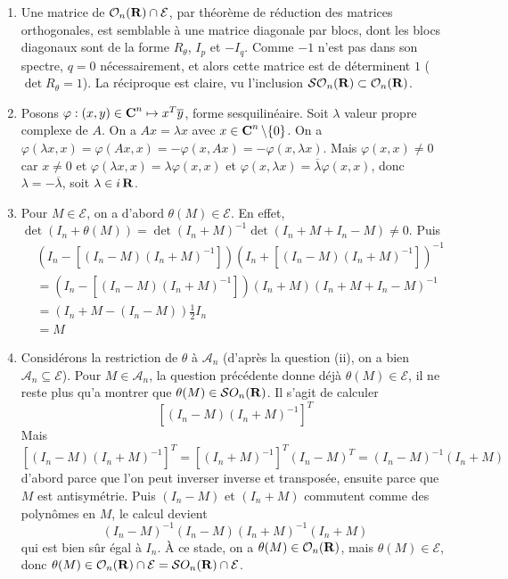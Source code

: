 \begin{correction}
	\begin{enumerate}
		\item Une matrice de $\mathcal O_n(\operatorname{\mathbf{R}})\cap \mathcal E$, par théorème de réduction des matrices orthogonales,
		est semblable à une matrice diagonale par blocs, dont les blocs diagonaux sont de la forme $R_\theta$, $I_p$ et $-I_q$.
		Comme $-1$ n'est pas dans son spectre, $q=0$ nécessairement, et alors cette matrice est de déterminent $1$ ($\det R_\theta = 1$).
		La réciproque est claire, vu l'inclusion $\mathcal{SO}_n(\operatorname{\mathbf{R}})\subset \mathcal{O}_n(\operatorname{\mathbf{R}})$.

		\item Posons $\varphi:(x,y)\in\operatorname{\mathbf{C}}^n\mapsto x^T\overline y$, forme sesquilinéaire. 
		Soit $\lambda$ valeur propre complexe de $A$. 
		On a $Ax=\lambda x$ avec $x\in \operatorname{\mathbf{C}}^n\backslash\lbrace 0\rbrace$. 
		On a $\varphi(\lambda x,x)=\varphi(Ax,x)=-\varphi(x,Ax)=-\varphi(x,\lambda x)$.
		Mais $\varphi(x,x)\neq 0$ car $x\neq 0$ et $\varphi(\lambda x,x)=\lambda\varphi(x,x)$ et $\varphi(x,\lambda x)=\overline\lambda\varphi(x,x)$,
		donc $\lambda=-\overline\lambda$, soit $\lambda\in i\operatorname{\mathbf{R}}$.

		\item Pour $M\in\mathcal E$, on a d'abord $\theta(M)\in\mathcal E$. 
		En effet, $\det(I_n+\theta(M))=\det(I_n+M)^{-1}\det(I_n+M+I_n-M)\neq 0$.
		Puis
		\begin{align*}
			&	(I_n-[(I_n-M)(I_n+M)^{-1}])(I_n+[(I_n-M)(I_n+M)^{-1}])^{-1}\\
			& = (I_n-[(I_n-M)(I_n+M)^{-1}])(I_n+M)(I_n+M+I_n-M)^{-1}\\
			& = (I_n+M-(I_n-M))\frac12 I_n\\
			& = M
		\end{align*}

		\item Considérons la restriction de $\theta$ à $\mathcal A_n$ (d'après la question (ii), on a bien $\mathcal A_n\subseteq \mathcal E$).
		Pour $M\in\mathcal A_n$, la question précédente donne déjà $\theta(M)\in \mathcal E$, il ne reste plus qu'a montrer que $\theta(M)\in\mathcal SO_n(\operatorname{\mathbf{R}})$.
		Il s'agit de calculer 
		\[
			[(I_n-M)(I_n+M)^{-1}]^T
		\] 
		Mais $[(I_n-M)(I_n+M)^{-1}]^T=[(I_n+M)^{-1}]^T(I_n-M)^T=(I_n-M)^{-1}(I_n+M)$ 
		d'abord parce que l'on peut inverser inverse et transposée, ensuite parce que $M$ 
		est antisymétrie. Puis $(I_n-M)$ et $(I_n+M)$ commutent comme des polynômes en $M$, le calcul devient 
		\[
			(I_n-M)^{-1}(I_n-M)(I_n+M)^{-1}(I_n+M)
		\]
		qui est bien sûr égal à $I_n$. 
		À ce stade, on a $\theta(M)\in\mathcal O_n(\operatorname{\mathbf{R}})$, mais $\theta(M)\in\mathcal E$, donc $\theta(M)\in\mathcal O_n(\operatorname{\mathbf{R}})\cap\mathcal E=\mathcal SO_n(\operatorname{\mathbf{R}})\cap\mathcal E$.


	\end{enumerate}
\end{correction}


